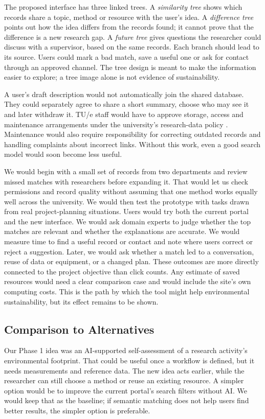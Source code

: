 \documentclass[11pt,a4paper]{article}
\begin{document}
The proposed interface has three linked trees. A \emph{similarity tree} shows which records share a topic, method or resource with the user's idea. A \emph{difference tree} points out how the idea differs from the records found; it cannot prove that the difference is a new research gap. A \emph{future tree} gives questions the researcher could discuss with a supervisor, based on the same records. Each branch should lead to its source. Users could mark a bad match, save a useful one or ask for contact through an approved channel. The tree design is meant to make the information easier to explore; a tree image alone is not evidence of sustainability.

A user's draft description would not automatically join the shared database. They could separately agree to share a short summary, choose who may see it and later withdraw it. TU/e staff would have to approve storage, access and maintenance arrangements under the university's research-data policy \citep{tuerdm}. Maintenance would also require responsibility for correcting outdated records and handling complaints about incorrect links. Without this work, even a good search model would soon become less useful.

We would begin with a small set of records from two departments and review missed matches with researchers before expanding it. That would let us check permissions and record quality without assuming that one method works equally well across the university. We would then test the prototype with tasks drawn from real project-planning situations. Users would try both the current portal and the new interface. We would ask domain experts to judge whether the top matches are relevant and whether the explanations are accurate. We would measure time to find a useful record or contact and note where users correct or reject a suggestion. Later, we would ask whether a match led to a conversation, reuse of data or equipment, or a changed plan. These outcomes are more directly connected to the project objective than click counts. Any estimate of saved resources would need a clear comparison case and would include the site's own computing costs. This is the path by which the tool might help environmental sustainability, but its effect remains to be shown.

\subsection*{Comparison to Alternatives}

Our Phase 1 idea was an AI-supported self-assessment of a research activity's environmental footprint. That could be useful once a workflow is defined, but it needs measurements and reference data. The new idea acts earlier, while the researcher can still choose a method or reuse an existing resource. A simpler option would be to improve the current portal's search filters without AI. We would keep that as the baseline; if semantic matching does not help users find better results, the simpler option is preferable.
\end{document}
